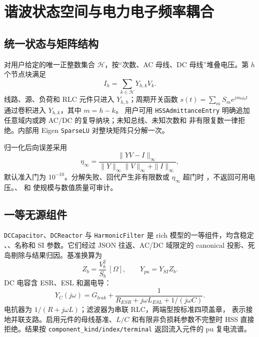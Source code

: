 \section{谐波状态空间与电力电子频率耦合}
\label{sec:hss}

\subsection{统一状态与矩阵结构}
 对用户给定的唯一正整数集合
$\mathcal H$，按“次数、AC 母线、DC 母线”堆叠电压。第 $h$ 个节点块满足
\begin{equation}
 I_h=\sum_{k\in\mathcal H}Y_{h,k}V_k.
\end{equation}
线路、源、负荷和 RLC 元件只进入 $Y_{h,h}$；周期开关函数
$s(t)=\sum_m S_m e^{jm\omega_0t}$ 通过卷积进入 $Y_{h,k}$，其中 $m=h-k$。
用户可用 \texttt{HSSAdmittanceEntry} 明确追加任意域内或跨 AC/DC 的复导纳块；未知总线、未知次数和
非有限复数一律拒绝。内部用 Eigen \texttt{SparseLU} 对整块矩阵只分解一次。

归一化后向误差采用
\begin{equation}
 \eta_\infty=\frac{\|YV-I\|_\infty}
 {\|Y\|_\infty\|V\|_\infty+\|I\|_\infty},
\end{equation}
默认准入门为 $10^{-10}$。分解失败、回代产生非有限数或 $\eta_\infty$ 超门时
，不返回可用电压。、 和
 使规模与数值质量可审计。

\subsection{一等无源组件}
\texttt{DCCapacitor}、\texttt{DCReactor} 与 \texttt{HarmonicFilter} 是 rich 模型的一等组件，均含稳定
、、名称和 SI 参数。它们经过 JSON 往返、AC/DC 域限定的 canonical
投影、死岛剔除与结果归因。基准换算为
\begin{equation}
 Z_b=\frac{V_b^2}{S_b}\ [\Omega],\qquad Y_{pu}=Y_{SI}Z_b.
\end{equation}
DC 电容含 ESR、ESL 和漏电导：
\begin{equation}
 Y_C(j\omega)=G_{leak}+\frac{1}{R_{ESR}+j\omega L_{ESL}+1/(j\omega C)}.
\end{equation}
电抗器为 $1/(R+j\omega L)$；滤波器为串联 RLC，两端型按标准四项盖章，
 表示接地并联支路。启用元件的母线基准、$L/C$ 和有限非负损耗参数不完整时 HSS
直接拒绝。结果按 \texttt{component\_kind/index/terminal} 返回流入元件的 pu 复电流谱。

